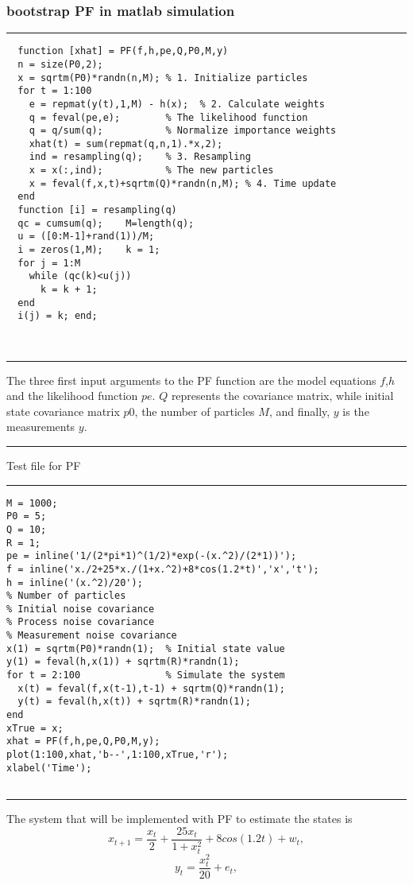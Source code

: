 \documentclass[11pt,oneside,a4paper]{article}
\begin{document}
\subsubsection{bootstrap PF in matlab simulation}
\rule{\textwidth}{1mm}
\begin{lstlisting}
  function [xhat] = PF(f,h,pe,Q,P0,M,y)
  n = size(P0,2);
  x = sqrtm(P0)*randn(n,M); % 1. Initialize particles
  for t = 1:100
    e = repmat(y(t),1,M) - h(x);  % 2. Calculate weights
    q = feval(pe,e);        % The likelihood function
    q = q/sum(q);           % Normalize importance weights
    xhat(t) = sum(repmat(q,n,1).*x,2);
    ind = resampling(q);    % 3. Resampling
    x = x(:,ind);           % The new particles
    x = feval(f,x,t)+sqrtm(Q)*randn(n,M); % 4. Time update
  end
  function [i] = resampling(q)
  qc = cumsum(q);    M=length(q);
  u = ([0:M-1]+rand(1))/M;
  i = zeros(1,M);    k = 1;
  for j = 1:M
    while (qc(k)<u(j))
      k = k + 1;
  end
  i(j) = k; end;

\end{lstlisting}
\\
\rule{\textwidth}{1mm}
The three first input arguments to the PF function are the model equations $f$,$h$
and the likelihood function $pe$. $Q$ represents the covariance matrix, while initial
state covariance matrix $p0$, the number of particles $M$, and finally, $y$ is the measurements
$y$.
\\
\rule{\textwidth}{1mm}
Test file for PF
\\
\rule{\textwidth}{1mm}
\begin{lstlisting}
M = 1000;
P0 = 5;
Q = 10;
R = 1;
pe = inline('1/(2*pi*1)^(1/2)*exp(-(x.^2)/(2*1))');
f = inline('x./2+25*x./(1+x.^2)+8*cos(1.2*t)','x','t');
h = inline('(x.^2)/20');
% Number of particles
% Initial noise covariance
% Process noise covariance
% Measurement noise covariance
x(1) = sqrtm(P0)*randn(1);  % Initial state value
y(1) = feval(h,x(1)) + sqrtm(R)*randn(1);
for t = 2:100               % Simulate the system
  x(t) = feval(f,x(t-1),t-1) + sqrtm(Q)*randn(1);
  y(t) = feval(h,x(t)) + sqrtm(R)*randn(1);
end
xTrue = x;
xhat = PF(f,h,pe,Q,P0,M,y);
plot(1:100,xhat,'b--',1:100,xTrue,'r');
xlabel('Time');


\end{lstlisting}
\rule{\textwidth}{1mm}
The system that will be implemented with PF to estimate the states is
\begin{equation}
x_{t+1} = \frac{x_t}{2} + \frac{25x_t}{1+x_{t}^2} + 8cos(1.2t) + w_t,
\end{equation}
\begin{equation}
y_t = \frac {x_t^2}{20} + e_t,
\end{equation}
\\\\\\\\
\end{document}
